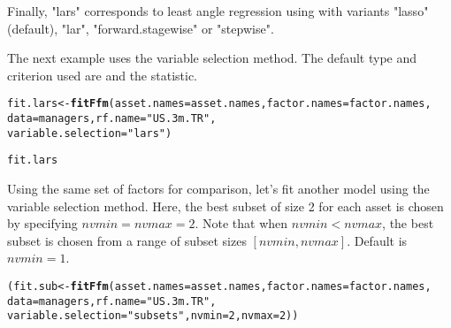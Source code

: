 \documentclass[a4paper]{article}\usepackage[]{graphicx}\usepackage[]{color}
\makeatletter
\newcommand{\hlnum}[1]{\textcolor[rgb]{0.686,0.059,0.569}{#1}}%
\newcommand{\hlstr}[1]{\textcolor[rgb]{0.192,0.494,0.8}{#1}}%
\newcommand{\hlstd}[1]{\textcolor[rgb]{0.345,0.345,0.345}{#1}}%
\newcommand{\hlkwb}[1]{\textcolor[rgb]{0.69,0.353,0.396}{#1}}%
\newcommand{\hlkwc}[1]{\textcolor[rgb]{0.333,0.667,0.333}{#1}}%
\newcommand{\hlkwd}[1]{\textcolor[rgb]{0.737,0.353,0.396}{\textbf{#1}}}%
\newenvironment{kframe}{%
 \def\at@end@of@kframe{}%
 \ifinner\ifhmode%
  \def\at@end@of@kframe{\end{minipage}}%
  \begin{minipage}{\columnwidth}%
 \fi\fi%
 \def\FrameCommand##1{\hskip\@totalleftmargin \hskip-\fboxsep
 \colorbox{shadecolor}{##1}\hskip-\fboxsep
     \hskip-\linewidth \hskip-\@totalleftmargin \hskip\columnwidth}%
 \MakeFramed {\advance\hsize-\width
   \@totalleftmargin\z@ \linewidth\hsize
   \@setminipage}}%
 {\par\unskip\endMakeFramed%
 \at@end@of@kframe}
\newenvironment{knitrout}{}{} %
\makeatother
\begin{document}
Finally, "lars" corresponds to least angle regression using  with variants "lasso" (default), "lar", "forward.stagewise" or "stepwise".  



The next example uses the  variable selection method. The default type and criterion used are  and the  statistic.
\begin{knitrout}
\color{fgcolor}\begin{kframe}
\begin{alltt}
\hlstd{fit.lars} \hlkwb{<-} \hlkwd{fitFfm}\hlstd{(}\hlkwc{asset.names}\hlstd{=asset.names,} \hlkwc{factor.names}\hlstd{=factor.names,}
                    \hlkwc{data}\hlstd{=managers,} \hlkwc{rf.name}\hlstd{=}\hlstr{"US.3m.TR"}\hlstd{,}
                    \hlkwc{variable.selection}\hlstd{=}\hlstr{"lars"}\hlstd{)}
\end{alltt}


{\ttfamily\noindent\bfseries\color{errorcolor}{\#\# Error in is.data.frame(data): object 'managers' not found}}\begin{alltt}
\hlstd{fit.lars}
\end{alltt}


{\ttfamily\noindent\bfseries\color{errorcolor}{\#\# Error in eval(expr, envir, enclos): object 'fit.lars' not found}}\end{kframe}
\end{knitrout}

\newpage
Using the same set of factors for comparison, let's fit another model using the  variable selection method. Here, the best subset of size 2 for each asset is chosen by specifying $nvmin = nvmax = 2$. Note that when $nvmin < nvmax$, the best subset is chosen from a range of subset sizes $[nvmin, nvmax]$. Default is $nvmin = 1$.
\begin{knitrout}
\color{fgcolor}\begin{kframe}
\begin{alltt}
\hlstd{(fit.sub} \hlkwb{<-} \hlkwd{fitFfm}\hlstd{(}\hlkwc{asset.names}\hlstd{=asset.names,} \hlkwc{factor.names}\hlstd{=factor.names,}
                    \hlkwc{data}\hlstd{=managers,} \hlkwc{rf.name}\hlstd{=}\hlstr{"US.3m.TR"}\hlstd{,}
                    \hlkwc{variable.selection}\hlstd{=}\hlstr{"subsets"}\hlstd{,} \hlkwc{nvmin}\hlstd{=}\hlnum{2}\hlstd{,} \hlkwc{nvmax}\hlstd{=}\hlnum{2}\hlstd{))}
\end{alltt}


{\ttfamily\noindent\bfseries\color{errorcolor}{\#\# Error in is.data.frame(data): object 'managers' not found}}\end{kframe}
\end{knitrout}
\end{document}
